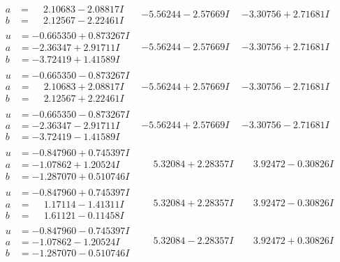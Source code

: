 \documentclass[1p]{elsarticle_modified}
\theoremstyle{definition}
\begin{document}
$$\begin{array}{c|c|c}
\begin{aligned}
a &= \phantom{-}2.10683 - 2.08817 I \\
b &= \phantom{-}2.12567 - 2.22461 I\end{aligned}
 & -5.56244 - 2.57669 I & -3.30756 + 2.71681 I \\ \hline\begin{aligned}
u &= -0.665350 + 0.873267 I \\
a &= -2.36347 + 2.91711 I \\
b &= -3.72419 + 1.41589 I\end{aligned}
 & -5.56244 - 2.57669 I & -3.30756 + 2.71681 I \\ \hline\begin{aligned}
u &= -0.665350 - 0.873267 I \\
a &= \phantom{-}2.10683 + 2.08817 I \\
b &= \phantom{-}2.12567 + 2.22461 I\end{aligned}
 & -5.56244 + 2.57669 I & -3.30756 - 2.71681 I \\ \hline\begin{aligned}
u &= -0.665350 - 0.873267 I \\
a &= -2.36347 - 2.91711 I \\
b &= -3.72419 - 1.41589 I\end{aligned}
 & -5.56244 + 2.57669 I & -3.30756 - 2.71681 I \\ \hline\begin{aligned}
u &= -0.847960 + 0.745397 I \\
a &= -1.07862 + 1.20524 I \\
b &= -1.287070 + 0.510746 I\end{aligned}
 & \phantom{-}5.32084 + 2.28357 I & \phantom{-}3.92472 - 0.30826 I \\ \hline\begin{aligned}
u &= -0.847960 + 0.745397 I \\
a &= \phantom{-}1.17114 - 1.41311 I \\
b &= \phantom{-}1.61121 - 0.11458 I\end{aligned}
 & \phantom{-}5.32084 + 2.28357 I & \phantom{-}3.92472 - 0.30826 I \\ \hline\begin{aligned}
u &= -0.847960 - 0.745397 I \\
a &= -1.07862 - 1.20524 I \\
b &= -1.287070 - 0.510746 I\end{aligned}
 & \phantom{-}5.32084 - 2.28357 I & \phantom{-}3.92472 + 0.30826 I \\ \hline\begin{aligned}

\end{aligned}
\end{array}$$
\end{document}
